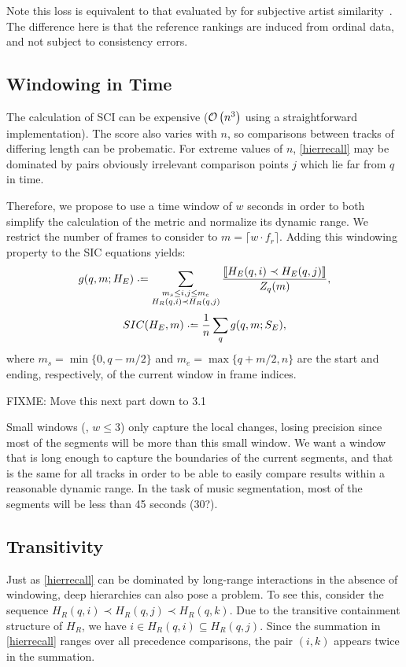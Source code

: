 \documentclass{article}
\begin{document}
Note this loss is equivalent to that evaluated by for subjective artist similarity~\cite{mcfee2011}.
The difference here is that the reference rankings are induced from ordinal data, and not subject to consistency errors.

\subsection{Windowing in Time}

The calculation of SCI can be expensive ($\mathcal{O}\left(n^3\right)$ using a straightforward 
implementation).
The score also varies with $n$, so comparisons between tracks of differing length can
be probematic.  For extreme values of $n$, \cref{hierrecall} may be dominated by pairs
obviously irrelevant comparison points $j$ which lie far from $q$ in time.

Therefore, we propose to use a time window of $w$ seconds in order to both simplify the 
calculation of the metric and normalize its dynamic range.
We restrict the number of frames to consider to $m = \lceil w \cdot f_r \rceil$.
Adding this windowing property to the SIC equations yields:
\begin{equation}
  g(q, m ; H_E) \defeq \sum_{\substack{
  m_s \leq i,j \leq m_e \\ 
  H_R(q, i) \prec H_R(q, j) }} \frac{\ind{H_E(q, i) \prec H_E(q,
  j)}}{Z_q(m)},\label{windowrecall}
\end{equation}
\begin{equation}
SIC(H_E,m) \defeq \frac{1}{n} \sum_q g(q,m ; S_E),
\end{equation}
where $m_s = \min\{0,q-m/2\}$ and $m_e = \max\{q+m/2,n\}$ are the start and ending, respectively, of the current window in frame indices.

FIXME: Move this next part down to 3.1

Small windows (\eg, $w \leq 3$) only capture the local changes, 
losing precision since most of the segments will be more than this small window.
We want a window that is long enough to capture the boundaries of the current segments, and that is the same for all tracks in order to be able to easily compare results within a reasonable dynamic range.
In the task of music segmentation, most of the segments will be less than 45 seconds (30?).

\subsection{Transitivity}
Just as \cref{hierrecall} can be dominated by long-range interactions in the absence
of windowing, deep hierarchies can also pose a problem.  To see this, consider the 
sequence $H_R(q, i) \prec H_R(q, j) \prec H_R(q, k)$.  Due to the transitive
containment structure of $H_R$, we have $i \in H_R(q, i) \subseteq H_R(q, j)$.
Since the summation in \cref{hierrecall} ranges over all precedence comparisons, the
pair $(i, k)$ appears twice in the summation.  
\end{document}
